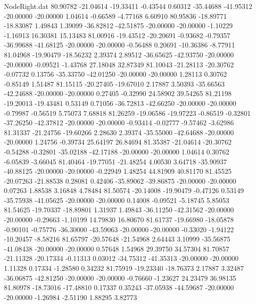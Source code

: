 \begin{filecontents}{NodeRight.dat}
  80.90782  -21.04614  -19.33411    -0.43544    0.60312  -35.44688  -41.95312  -20.00000  -20.00000    1.04614   -0.66589   -4.77168    6.60910
  80.95836  -18.89771  -18.83087     1.49843    1.39099  -36.82812  -42.51875  -20.00000  -20.00000   -1.10229   -1.16913   16.30381   15.13483
  81.00916  -19.43512  -20.20691    -0.93682   -0.79357  -36.99688  -41.68125  -20.00000  -20.00000   -0.56488    0.20691  -10.36386   -8.77911
  81.04968  -19.90479  -18.56232     2.39374    2.89512  -36.65625  -42.93750  -20.00000  -20.00000   -0.09521   -1.43768   27.18048   32.87349
  81.10043  -21.28113  -20.30762    -0.07732    0.13756  -35.33750  -42.01250  -20.00000  -20.00000    1.28113    0.30762   -0.85149    1.51487
  81.15115  -20.27405  -19.67010     2.17887    3.50393  -35.66563  -42.24688  -20.00000  -20.00000    0.27405   -0.32990   24.58902   39.54265
  81.21198  -19.20013  -19.43481     0.53149    0.71056  -36.72813  -42.66250  -20.00000  -20.00000   -0.79987   -0.56519    5.75073    7.68818
  81.26259  -19.06586  -19.97223    -0.86519   -0.32801  -37.26250  -42.37812  -20.00000  -20.00000   -0.93414   -0.02777   -9.57462   -3.62986
  81.31337  -21.24756  -19.60266     2.28630    2.39374  -35.55000  -42.64688  -20.00000  -20.00000    1.24756   -0.39734   25.64197   26.84694
  81.35387  -21.04614  -20.30762    -0.54288   -0.32801  -35.02188  -42.17188  -20.00000  -20.00000    1.04614    0.30762   -6.05839   -3.66045
  81.40464  -19.77051  -21.48254     4.00530    3.64718  -35.90937  -40.88125  -20.00000  -20.00000   -0.22949    1.48254   44.81909   40.81170
  81.45525  -20.07263  -21.88538     0.28081    0.42406  -35.89062  -39.86875  -20.00000  -20.00000    0.07263    1.88538    3.16848    4.78484
  81.50574  -20.14008  -19.90479    -0.47126    0.53149  -35.75938  -41.05625  -20.00000  -20.00000    0.14008   -0.09521   -5.18745    5.85053
  81.54625  -19.70337  -18.89801     1.31937    1.49843  -36.11250  -42.31562  -20.00000  -20.00000   -0.29663   -1.10199   14.79830   16.80670
  81.61737  -19.66980  -18.05878    -0.90101   -0.75776  -36.30000  -43.59063  -20.00000  -20.00000   -0.33020   -1.94122  -10.20457   -8.58216
  81.65797  -20.57648  -21.54968     2.64443    3.10999  -35.56875  -41.08438  -20.00000  -20.00000    0.57648    1.54968   29.39750   34.57304
  81.70857  -21.11328  -20.17334    -0.11313    0.03012  -34.75312  -41.35313  -20.00000  -20.00000    1.11328    0.17334   -1.28580    0.34232
  81.75919  -19.23340  -18.76373     2.17887    3.32487  -36.06875  -42.81250  -20.00000  -20.00000   -0.76660   -1.23627   24.23479   36.98135
  81.80978  -18.73016  -17.48810     0.17337    0.35243  -37.05938  -44.59687  -20.00000  -20.00000   -1.26984   -2.51190    1.88295    3.82773

\end{filecontents}

